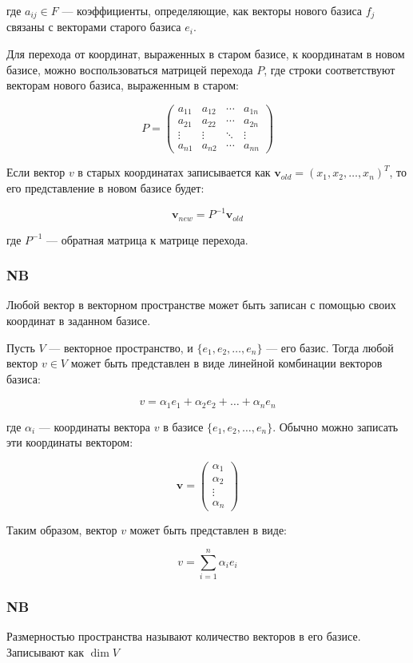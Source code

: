 где $a_{ij} \in F$ — коэффициенты, определяющие, как векторы нового базиса $f_j$ связаны с векторами старого базиса $e_i$.

Для перехода от координат, выраженных в старом базисе, к координатам в новом базисе, можно воспользоваться матрицей перехода $P$, где строки соответствуют векторам нового базиса, выраженным в старом:

\[
P = \begin{pmatrix}
a_{11} & a_{12} & \cdots & a_{1n} \\
a_{21} & a_{22} & \cdots & a_{2n} \\
\vdots & \vdots & \ddots & \vdots \\
a_{n1} & a_{n2} & \cdots & a_{nn}
\end{pmatrix}
\]

Если вектор $v$ в старых координатах записывается как $\mathbf{v}_{old} = (x_1, x_2, \ldots, x_n)^T$, то его представление в новом базисе будет:

\[
\mathbf{v}_{new} = P^{-1} \mathbf{v}_{old}
\]

где $P^{-1}$ — обратная матрица к матрице перехода.

\subsubsection*{NB}
Любой вектор в векторном пространстве может быть записан с помощью своих координат в заданном базисе. 

Пусть $V$ — векторное пространство, и $\{e_1, e_2, \ldots, e_n\}$ — его базис. Тогда любой вектор $v \in V$ может быть представлен в виде линейной комбинации векторов базиса:

\[
v = \alpha_1 e_1 + \alpha_2 e_2 + \ldots + \alpha_n e_n
\]

где $\alpha_i$ — координаты вектора $v$ в базисе $\{e_1, e_2, \ldots, e_n\}$. Обычно можно записать эти координаты вектором:

\[
\mathbf{v} = \begin{pmatrix}
\alpha_1 \\
\alpha_2 \\
\vdots \\
\alpha_n
\end{pmatrix}
\]

Таким образом, вектор $v$ может быть представлен в виде:

\[
v = \sum_{i=1}^{n} \alpha_i e_i
\]

\subsubsection*{NB}
Размерностью пространства называют количество векторов в его базисе.\\
Записывают как $\dim V$\\

